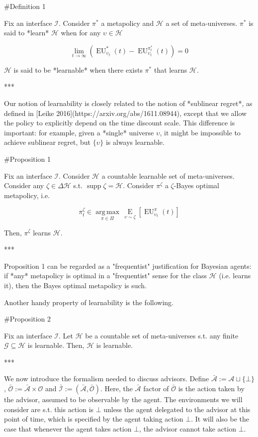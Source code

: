 \documentclass[a4paper]{article}
\DeclareMathOperator{\Supp}{supp}
\newcommand{\E}[1]{\underset{#1}{\operatorname{E}}}
\newcommand{\Argmax}[1]{\underset{#1}{\operatorname{arg\,max}}\,}
\newcommand{\Ob}{\mathcal{O}}
\newcommand{\A}{\mathcal{A}}
\newcommand{\I}{\mathcal{I}}
\newcommand{\Ado}{\bar{\Ob}}
\newcommand{\Ada}{\bar{\A}}
\newcommand{\Adi}{\bar{\I}}
\newcommand{\Hy}{\mathcal{H}}
\newcommand{\EU}{\operatorname{EU}}
\begin{document}
\#Definition 1

Fix an interface $\I$. Consider $\pi^*$ a metapolicy and $\Hy$ a set of meta-universes. $\pi^*$ is said to *learn* $\Hy$ when for any $\upsilon \in \Hy$

$$\lim_{t \rightarrow \infty} (\EU_{\upsilon_t}^{*}(t) - \EU_{\upsilon_t}^{\pi^*_t}(t)) = 0$$

$\Hy$ is said to be *learnable* when there exists $\pi^*$ that learns $\Hy$.

***

Our notion of learnability is closely related to the notion of *sublinear regret*, as defined in [Leike 2016](https://arxiv.org/abs/1611.08944), except that we allow the policy to explicitly depend on the time discount scale. This difference is important: for example, given a *single* universe $\upsilon$, it might be impossible to achieve sublinear regret, but $\{\upsilon\}$ is always learnable.

\#Proposition 1

Fix an interface $\I$. Consider $\Hy$ a countable learnable set of meta-universes. Consider any $\zeta \in \Delta\Hy$ s.t. $\Supp \zeta = \Hy$. Consider $\pi^\zeta$ a $\zeta$-Bayes optimal metapolicy, i.e.

$$\pi^\zeta_t \in \Argmax{\pi \in \Pi} \E{\upsilon \sim \zeta}[\EU_{\upsilon_t}^{\pi}(t)]$$

Then, $\pi^\zeta$ learns $\Hy$.

***

Proposition 1 can be regarded as a "frequentist" justification for Bayesian agents: if *any* metapolicy is optimal in a "frequentist" sense for the class $\Hy$ (i.e. learns it), then the Bayes optimal metapolicy is such.

Another handy property of learnability is the following.

\#Proposition 2

Fix an interface $\I$. Let $\Hy$ be a countable set of meta-universes s.t. any finite $\mathcal{G} \subseteq \Hy$ is learnable. Then, $\Hy$ is learnable.

***

We now introduce the formalism needed to discuss advisors. Define $\Ada:=\A \sqcup \{\bot\}$, $\Ado:=\Ada \times \Ob$ and $\Adi:=(\Ada,\Ado)$. Here, the $\Ada$ factor of $\Ado$ is the action taken by the advisor, assumed to be observable by the agent. The environments we will consider are s.t. this action is $\bot$ unless the agent delegated to the advisor at this point of time, which is specified by the agent taking action $\bot$. It will also be the case that whenever the agent takes action $\bot$, the advisor cannot take action $\bot$.
\end{document}
